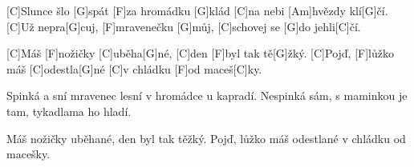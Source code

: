 
[C]Slunce šlo [G]spát 
[F]za hromádku [G]klád
[C]na nebi [Am]hvězdy klí[G]\null čí.
[C]Už nepra[G]cuj, [F]mravenečku [G]můj,
[C]schovej se [G]do jehli[C]\null čí.


[C]Máš [F]nožičky [C]uběha[G]né,
[C]den [F]byl tak tě[G]\null žký.
[C]Pojď, [F]lůžko máš [C]odestla[G]né
[C]v chládku [F]od maceš[C]ky.

Spinká a sní
mravenec lesní
v hromádce u kapradí.
Nespinká sám,
s maminkou je tam,
tykadlama ho hladí.

Máš nožičky uběhané,
den byl tak těžký.
Pojď, lůžko máš odestlané
v chládku od macešky.